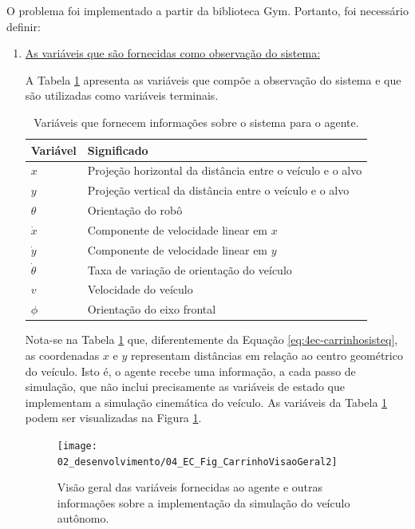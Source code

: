 O problema foi implementado a partir da biblioteca Gym. Portanto, foi necessário definir:

\begin{enumerate}[label=\alph*)]
	
	\item \underline{As variáveis que são fornecidas como observação do sistema:}
	
	A Tabela \ref{tab:4ec-carrinhovarestado} apresenta as variáveis que compõe a observação do sistema e que são utilizadas como variáveis terminais. 
	
	\begin{table}[H]
		\centering
		\caption{Variáveis que fornecem informações sobre o sistema para o agente.}
		\label{tab:4ec-carrinhovarestado}
		\begin{tabular}{l|l} \toprule
			{Variável} & {Significado}\\ \midrule
			{$x$} & {Projeção horizontal da distância entre o veículo e o alvo} \\
			{$y$} & {Projeção vertical da distância entre o veículo e o alvo} \\
			{$\theta$} & {Orientação do robô} \\
			{$\dot{x}$} & {Componente de velocidade linear em $x$} \\
			{$\dot{y}$} & {Componente de velocidade linear em $y$} \\
			{$\dot{\theta}$} & {Taxa de variação de orientação do veículo} \\
			{$v$} & {Velocidade do veículo} \\
			{$\phi$} & {Orientação do eixo frontal}\\
			\bottomrule
		\end{tabular}
	\end{table}
	
	Nota-se na Tabela \ref{tab:4ec-carrinhovarestado} que, diferentemente da Equação \ref{eq:4ec-carrinhosisteq}, as coordenadas $x$ e $y$ representam distâncias em relação ao centro geométrico do veículo. Isto é, o agente recebe uma informação, a cada passo de simulação, que não inclui precisamente as variáveis de estado que implementam a simulação cinemática do veículo. As variáveis da Tabela \ref{tab:4ec-carrinhovarestado} podem ser visualizadas na Figura \ref{fig:4ec-carrinhovisaogeral}.
	
	\begin{figure}[H]
		\centering
		\texttt{[image: 02\_desenvolvimento/04\_EC\_Fig\_CarrinhoVisaoGeral2]}
		\caption{Visão geral das variáveis fornecidas ao agente e outras informações sobre a implementação da simulação do veículo autônomo.}
		\label{fig:4ec-carrinhovisaogeral}
	\end{figure}
	

\end{enumerate}
